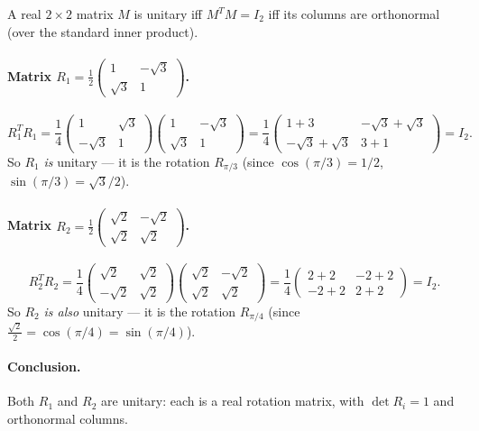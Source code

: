 \documentclass[11pt,a4paper]{article}
\begin{document}
A real $2\times 2$ matrix $M$ is unitary iff $M^{T}M=I_2$ iff its columns are orthonormal (over the standard inner product).

\paragraph{Matrix $R_1=\tfrac{1}{2}\begin{pmatrix}1 & -\sqrt{3}\\ \sqrt{3} & 1\end{pmatrix}$.}
\[
R_1^{T}R_1=\frac{1}{4}\begin{pmatrix}1 & \sqrt{3}\\ -\sqrt{3} & 1\end{pmatrix}\begin{pmatrix}1 & -\sqrt{3}\\ \sqrt{3} & 1\end{pmatrix}=\frac{1}{4}\begin{pmatrix}1+3 & -\sqrt{3}+\sqrt{3}\\ -\sqrt{3}+\sqrt{3} & 3+1\end{pmatrix}=I_2.
\]
So $R_1$ \emph{is} unitary --- it is the rotation $R_{\pi/3}$ (since $\cos(\pi/3)=1/2$, $\sin(\pi/3)=\sqrt{3}/2$).

\paragraph{Matrix $R_2=\tfrac{1}{2}\begin{pmatrix}\sqrt{2} & -\sqrt{2}\\ \sqrt{2} & \sqrt{2}\end{pmatrix}$.}
\[
R_2^{T}R_2=\frac{1}{4}\begin{pmatrix}\sqrt{2} & \sqrt{2}\\ -\sqrt{2} & \sqrt{2}\end{pmatrix}\begin{pmatrix}\sqrt{2} & -\sqrt{2}\\ \sqrt{2} & \sqrt{2}\end{pmatrix}=\frac{1}{4}\begin{pmatrix}2+2 & -2+2\\ -2+2 & 2+2\end{pmatrix}=I_2.
\]
So $R_2$ \emph{is also} unitary --- it is the rotation $R_{\pi/4}$ (since $\tfrac{\sqrt{2}}{2}=\cos(\pi/4)=\sin(\pi/4)$).

\paragraph{Conclusion.} Both $R_1$ and $R_2$ are unitary: each is a real rotation matrix, with $\det R_i = 1$ and orthonormal columns.
\end{document}
